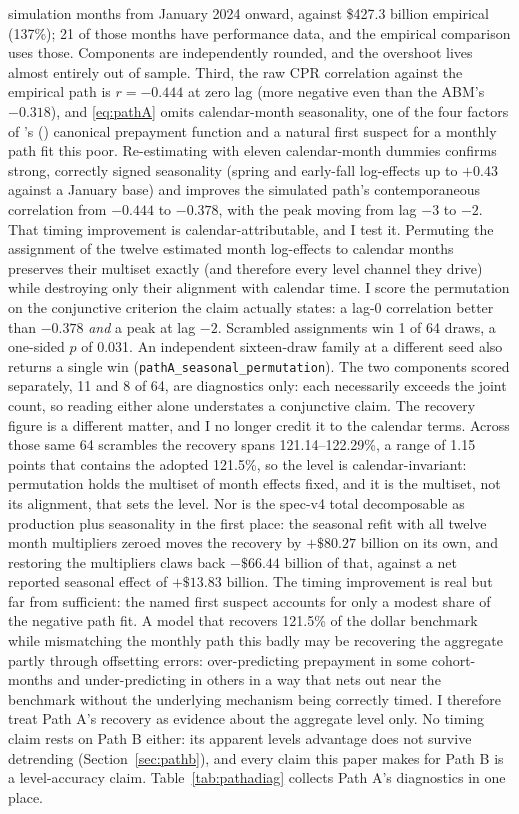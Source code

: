 \documentclass[12pt]{article}
\newcommand{\citepos}[1]{\citeauthor{#1}'s (\citeyear{#1})}
\begin{document}
simulation months from January 2024 onward, against \$427.3 billion empirical (137\%); 21 of those months have performance data, and the empirical comparison uses those. Components are independently rounded, and the overshoot lives almost entirely out of sample. Third, the raw CPR correlation against the empirical path is $r = -0.444$ at zero lag (more negative even than the ABM's $-0.318$), and \eqref{eq:pathA} omits calendar-month seasonality, one of the four factors of \citepos{richard1989} canonical prepayment function and a natural first suspect for a monthly path fit this poor. Re-estimating with eleven calendar-month dummies confirms strong, correctly signed seasonality (spring and early-fall log-effects up to $+0.43$ against a January base) and improves the simulated path's contemporaneous correlation from $-0.444$ to $-0.378$, with the peak moving from lag $-3$ to $-2$. That timing improvement is calendar-attributable, and I test it. Permuting the assignment of the twelve estimated month log-effects to calendar months preserves their multiset exactly (and therefore every level channel they drive) while destroying only their alignment with calendar time. I score the permutation on the conjunctive criterion the claim actually states: a lag-0 correlation better than $-0.378$ \emph{and} a peak at lag $-2$. Scrambled assignments win 1 of 64 draws, a one-sided $p$ of 0.031. An independent sixteen-draw family at a different seed also returns a single win (\texttt{pathA\_seasonal\_permutation}). The two components scored separately, 11 and 8 of 64, are diagnostics only: each necessarily exceeds the joint count, so reading either alone understates a conjunctive claim. The recovery figure is a different matter, and I no longer credit it to the calendar terms. Across those same 64 scrambles the recovery spans 121.14--122.29\%, a range of 1.15 points that contains the adopted 121.5\%, so the level is calendar-invariant: permutation holds the multiset of month effects fixed, and it is the multiset, not its alignment, that sets the level. Nor is the spec-v4 total decomposable as production plus seasonality in the first place: the seasonal refit with all twelve month multipliers zeroed moves the recovery by $+\$80.27$ billion on its own, and restoring the multipliers claws back $-\$66.44$ billion of that, against a net reported seasonal effect of $+\$13.83$ billion. The timing improvement is real but far from sufficient: the named first suspect accounts for only a modest share of the negative path fit. A model that recovers 121.5\% of the dollar benchmark while mismatching the monthly path this badly may be recovering the aggregate partly through offsetting errors: over-predicting prepayment in some cohort-months and under-predicting in others in a way that nets out near the benchmark without the underlying mechanism being correctly timed. I therefore treat Path A's recovery as evidence about the aggregate level only. No timing claim rests on Path B either: its apparent levels advantage does not survive detrending (Section~\ref{sec:pathb}), and every claim this paper makes for Path B is a level-accuracy claim. Table~\ref{tab:pathadiag} collects Path A's diagnostics in one place.
\end{document}
